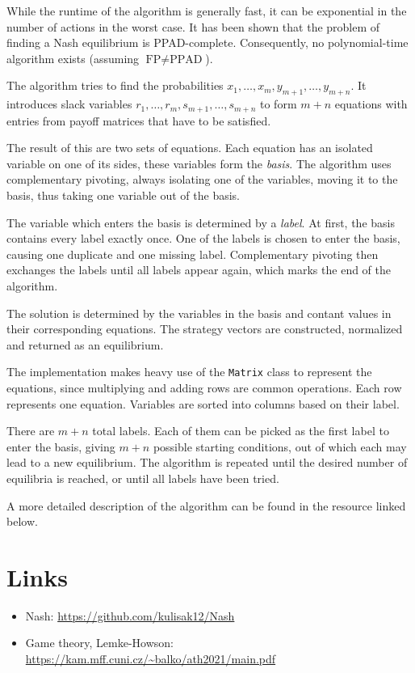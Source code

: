 \documentclass[a4paper,11pt]{article}
\begin{document}
While the runtime of the algorithm is generally fast, it can be exponential in the number of actions in the worst case. It has been shown that the problem of finding a Nash equilibrium is PPAD-complete. Consequently, no polynomial-time algorithm exists (assuming $\text{FP} \neq \text{PPAD}$).

The algorithm tries to find the probabilities $x_1, \dots, x_m, y_{m+1}, \dots, y_{m+n}$. It introduces slack variables $r_1, \dots, r_m, s_{m+1}, \dots, s_{m+n}$ to form $m + n$ equations with entries from payoff matrices that have to be satisfied.

The result of this are two sets of equations. Each equation has an isolated variable on one of its sides, these variables form the \textit{basis}. The algorithm uses complementary pivoting, always isolating one of the variables, moving it to the basis, thus taking one variable out of the basis.

The variable which enters the basis is determined by a \textit{label}. At first, the basis contains every label exactly once. One of the labels is chosen to enter the basis, causing one duplicate and one missing label. Complementary pivoting then exchanges the labels until all labels appear again, which marks the end of the algorithm.

The solution is determined by the variables in the basis and contant values in their corresponding equations. The strategy vectors are constructed, normalized and returned as an equilibrium.

The implementation makes heavy use of the \verb|Matrix| class to represent the equations, since multiplying and adding rows are common operations. Each row represents one equation. Variables are sorted into columns based on their label.

There are $m+n$ total labels. Each of them can be picked as the first label to enter the basis, giving $m+n$ possible starting conditions, out of which each may lead to a new equilibrium. The algorithm is repeated until the desired number of equilibria is reached, or until all labels have been tried.

A more detailed description of the algorithm can be found in the resource linked below.

\section{Links}

\begin{itemize}
	\item Nash: \url{https://github.com/kulisak12/Nash}
	\item Game theory, Lemke-Howson:\\
	\url{https://kam.mff.cuni.cz/~balko/ath2021/main.pdf}
\end{itemize}
\end{document}
